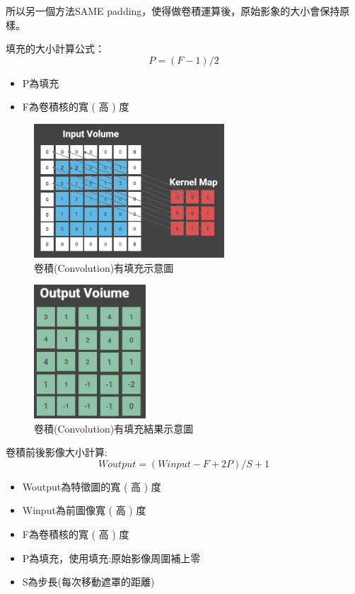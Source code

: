 所以另一個方法SAME padding，使得做卷積運算後，原始影象的大小會保持原樣。

填充的大小計算公式：
\begin{equation}
	\label{eqn:Padding}
	P=(F-1)/2
\end{equation}

\begin{itemize}
	\item
	      P為填充

	\item
	      F為卷積核的寬 ( 高 ) 度
\end{itemize}


\begin{figure}[H]
	\centerline{\includegraphics[height=5cm]{pic/samepadding.PNG}}
	\caption{卷積(Convolution)有填充示意圖}
	\label{fig:SamePadding}
\end{figure}
\begin{figure}[H]
	\centerline{\includegraphics[height=5cm]{pic/samepaddingout.PNG}}
	\caption{卷積(Convolution)有填充結果示意圖}
	\label{fig:SamePaddingOutcome}
\end{figure}


卷積前後影像大小計算:
\begin{equation}
	\label{eqn:ImageShapeAfterConvolution}
	Woutput=(Winput-F+2P)/S+1
\end{equation}

\begin{itemize}
	\item
	      Woutput為特徵圖的寬 ( 高 ) 度
	\item
	      Winput為前圖像寬 ( 高 ) 度
	\item
	      F為卷積核的寬 ( 高 ) 度
	\item
	      P為填充，使用填充:原始影像周圍補上零
	\item
	      S為步長(每次移動遮罩的距離)
\end{itemize}

